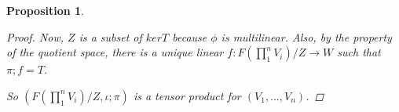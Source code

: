 \documentclass[a4paper,14pt]{article}
\newtheorem*{prop}{Proposition}
\begin{document}
\begin{prop}
\begin{proof}
Now, $Z$ is a subset of $ker T$ because $\phi$ is multilinear. Also, by the property of the quotient space, there is a unique linear $f: F(\prod_1^n V_i) / Z \to W$ such that $\pi; f = T$.

\begin{center}
\end{center}

So $(F(\prod_1^n V_i)/Z, \iota;\pi)$ is a tensor product for $(V_1, \ldots, V_n)$.
\end{proof}
\end{prop}
\end{document}
